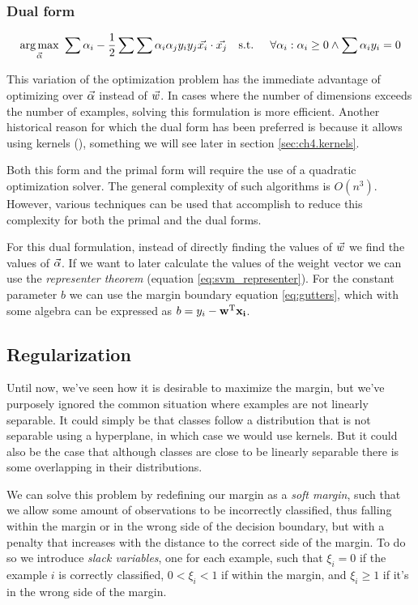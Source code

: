 \subsubsection*{Dual form}
\begin{align}
    \underset{\vec{\alpha}}{\text{arg} \max}\ \sum \alpha_i - \frac{1}{2} \sum \sum \alpha_i \alpha_j y_i y_j \vec{x_i} \cdot \vec{x_j}
    \text{\quad s.t. \quad} \forall \alpha_i : \alpha_i \ge 0 \land \sum \alpha_i y_i = 0
\end{align}

This variation of the optimization problem has the immediate advantage of op\-ti\-miz\-ing over $\vec{\alpha}$ instead of $\vec{w}$. In cases where the number of dimensions exceeds the number of examples, solving this formulation is more efficient. Another historical reason for which the dual form has been preferred is because it allows using kernels (\cite{chapelle_training_2007}), something we will see later in section \ref{sec:ch4.kernels}.

Both this form and the primal form will require the use of a quadratic op\-ti\-miza\-tion solver. The general complexity of such algorithms is $O(n^3)$. However, various techniques can be used that accomplish to reduce this complexity for both the primal and the dual forms.

For this dual formulation, instead of directly finding the values of $\vec{w}$ we find the values of $\vec{\alpha}$. If we want to later calculate the values of the weight vector we can use the \emph{representer theorem} (equation \ref{eq:svm_representer}). For the constant parameter $b$ we can use the margin boundary equation \ref{eq:gutters}, which with some algebra can be expressed as $b = y_i - \mathbf{w^{\text{T}}}\mathbf{x_i}$.

\subsection{Regularization}

Until now, we've seen how it is desirable to maximize the margin, but we've pur\-pose\-ly ignored the common situation where examples are not linearly separable. It could simply be that classes follow a distribution that is not separable using a hyperplane, in which case we would use kernels. But it could also be the case that although classes are close to be linearly separable there is some overlapping in their distributions.  

We can solve this problem by redefining our margin as a \emph{soft margin}, such that we allow some amount of observations to be incorrectly classified, thus falling within the margin or in the wrong side of the decision boundary, but with a penalty that increases with the distance to the correct side of the margin. To do so we introduce \emph{slack variables}, one for each example, such that $\xi_i = 0$ if the example $i$ is correctly classified, $0 < \xi_i < 1$ if within the margin, and $\xi_i \ge 1$ if it's in the wrong side of the margin.

